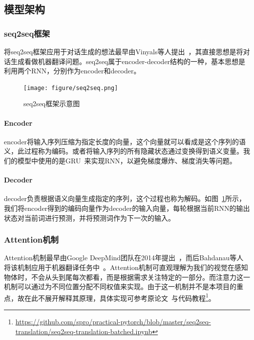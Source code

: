 \documentclass[12pt]{article} %
\begin{document}
\begin{sloppypar}
\subsection{模型架构}

\subsubsection{seq2seq框架}

将seq2seq框架应用于对话生成的想法最早由Vinyals等人提出~\cite{vinyals2015neural}，其直接思想是将对话生成看做机器翻译问题。seq2seq属于encoder-decoder结构的一种，基本思想是利用两个RNN，分别作为encoder和decoder。

\begin{figure}[h]
	\centering
	\texttt{[image: figure/seq2seq.png]}
	\caption{seq2seq框架示意图\protect\footnotemark}
	\label{fig:seq2seq}
\end{figure}

\paragraph{{\bf Encoder}} encoder将输入序列压缩为指定长度的向量，这个向量就可以看成是这个序列的语义，此过程称为编码。或者将输入序列的所有隐藏状态通过变换得到语义变量。我们的模型中使用的是GRU~\cite{chung2014empirical}来实现RNN，以避免梯度爆炸、梯度消失等问题。

\paragraph{{\bf Decoder}} decoder负责根据语义向量生成指定的序列，这个过程也称为解码。如图~\ref{fig:seq2seq}所示，我们将encoder得到的编码向量作为decoder的输入向量，每轮根据当前RNN的输出状态对当前词进行预测，并将预测词作为下一次的输入。



\subsubsection{Attention机制}

Attention机制最早由Google DeepMind团队在2014年提出~\cite{mnih2014recurrent}，而后Bahdanau等人将该机制应用于机器翻译任务中~\cite{bahdanau2014neural}。Attention机制可直观理解为我们的视觉在感知物体时，不会从头到尾每次都看，而是根据需求关注特定的一部分。而注意力这一机制可以通过为不同位置分配不同权值来实现。由于这一机制并不是本项目的重点，故在此不展开解释其原理，具体实现可参考原论文~\cite{bahdanau2014neural}与代码教程\footnote{\url{https://github.com/spro/practical-pytorch/blob/master/seq2seq-translation/seq2seq-translation-batched.ipynb}}。


\end{sloppypar}
\end{document}
